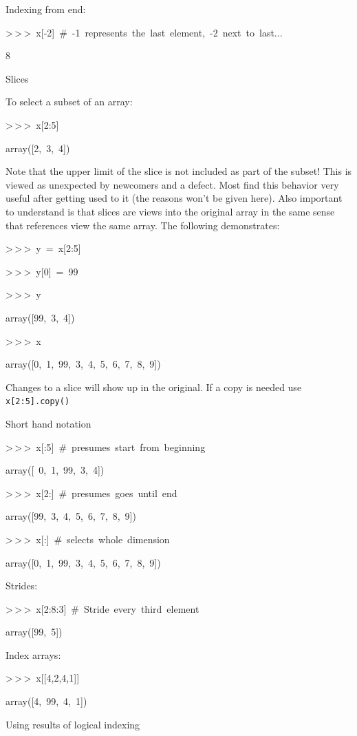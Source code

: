 Indexing from end:

\begin{lyxcode}
>\,{}>\,{}>~x{[}-2]~\#~-1~represents~the~last~element,~-2~next~to~last...

8
\end{lyxcode}
Slices

To select a subset of an array:

\begin{lyxcode}
>\,{}>\,{}>~x{[}2:5]

array({[}2,~3,~4])
\end{lyxcode}
Note that the upper limit of the slice is not included as part of
the subset! This is viewed as unexpected by newcomers and a defect.
Most find this behavior very useful after getting used to it (the
reasons won't be given here). Also important to understand is that
slices are views into the original array in the same sense that references
view the same array. The following demonstrates:

\begin{lyxcode}
>\,{}>\,{}>~y~=~x{[}2:5]

>\,{}>\,{}>~y{[}0]~=~99

>\,{}>\,{}>~y

array({[}99,~3,~4])

>\,{}>\,{}>~x

array({[}0,~1,~99,~3,~4,~5,~6,~7,~8,~9])
\end{lyxcode}
Changes to a slice will show up in the original. If a copy is needed
use \texttt{x{[}2:5].copy()}

Short hand notation

\begin{lyxcode}
>\,{}>\,{}>~x{[}:5]~\#~presumes~start~from~beginning

array({[}~0,~1,~99,~3,~4])

>\,{}>\,{}>~x{[}2:]~\#~presumes~goes~until~end

array({[}99,~3,~4,~5,~6,~7,~8,~9])

>\,{}>\,{}>~x{[}:]~\#~selects~whole~dimension

array({[}0,~1,~99,~3,~4,~5,~6,~7,~8,~9])
\end{lyxcode}
Strides:

\begin{lyxcode}
>\,{}>\,{}>~x{[}2:8:3]~\#~Stride~every~third~element

array({[}99,~5])
\end{lyxcode}
Index arrays:

\begin{lyxcode}
>\,{}>\,{}>~x{[}{[}4,2,4,1]]

array({[}4,~99,~4,~1])
\end{lyxcode}
Using results of logical indexing 

